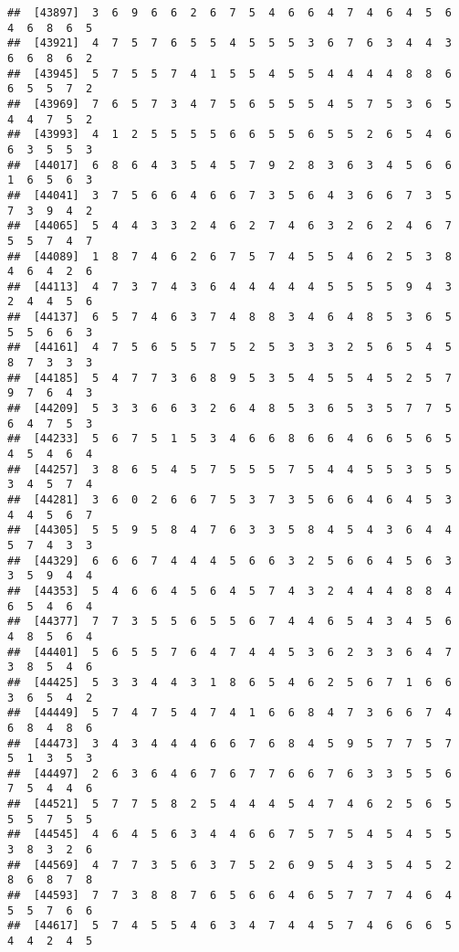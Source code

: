 \documentclass[
]{book}
\begin{document}
\begin{verbatim}
##  [43897]  3  6  9  6  6  2  6  7  5  4  6  6  4  7  4  6  4  5  6  4  6  8  6  5
##  [43921]  4  7  5  7  6  5  5  4  5  5  5  3  6  7  6  3  4  4  3  6  6  8  6  2
##  [43945]  5  7  5  5  7  4  1  5  5  4  5  5  4  4  4  4  8  8  6  6  5  5  7  2
##  [43969]  7  6  5  7  3  4  7  5  6  5  5  5  4  5  7  5  3  6  5  4  4  7  5  2
##  [43993]  4  1  2  5  5  5  5  6  6  5  5  6  5  5  2  6  5  4  6  6  3  5  5  3
##  [44017]  6  8  6  4  3  5  4  5  7  9  2  8  3  6  3  4  5  6  6  1  6  5  6  3
##  [44041]  3  7  5  6  6  4  6  6  7  3  5  6  4  3  6  6  7  3  5  7  3  9  4  2
##  [44065]  5  4  4  3  3  2  4  6  2  7  4  6  3  2  6  2  4  6  7  5  5  7  4  7
##  [44089]  1  8  7  4  6  2  6  7  5  7  4  5  5  4  6  2  5  3  8  4  6  4  2  6
##  [44113]  4  7  3  7  4  3  6  4  4  4  4  4  5  5  5  5  9  4  3  2  4  4  5  6
##  [44137]  6  5  7  4  6  3  7  4  8  8  3  4  6  4  8  5  3  6  5  5  5  6  6  3
##  [44161]  4  7  5  6  5  5  7  5  2  5  3  3  3  2  5  6  5  4  5  8  7  3  3  3
##  [44185]  5  4  7  7  3  6  8  9  5  3  5  4  5  5  4  5  2  5  7  9  7  6  4  3
##  [44209]  5  3  3  6  6  3  2  6  4  8  5  3  6  5  3  5  7  7  5  6  4  7  5  3
##  [44233]  5  6  7  5  1  5  3  4  6  6  8  6  6  4  6  6  5  6  5  4  5  4  6  4
##  [44257]  3  8  6  5  4  5  7  5  5  5  7  5  4  4  5  5  3  5  5  3  4  5  7  4
##  [44281]  3  6  0  2  6  6  7  5  3  7  3  5  6  6  4  6  4  5  3  4  4  5  6  7
##  [44305]  5  5  9  5  8  4  7  6  3  3  5  8  4  5  4  3  6  4  4  5  7  4  3  3
##  [44329]  6  6  6  7  4  4  4  5  6  6  3  2  5  6  6  4  5  6  3  3  5  9  4  4
##  [44353]  5  4  6  6  4  5  6  4  5  7  4  3  2  4  4  4  8  8  4  6  5  4  6  4
##  [44377]  7  7  3  5  5  6  5  5  6  7  4  4  6  5  4  3  4  5  6  4  8  5  6  4
##  [44401]  5  6  5  5  7  6  4  7  4  4  5  3  6  2  3  3  6  4  7  3  8  5  4  6
##  [44425]  5  3  3  4  4  3  1  8  6  5  4  6  2  5  6  7  1  6  6  3  6  5  4  2
##  [44449]  5  7  4  7  5  4  7  4  1  6  6  8  4  7  3  6  6  7  4  6  8  4  8  6
##  [44473]  3  4  3  4  4  4  6  6  7  6  8  4  5  9  5  7  7  5  7  5  1  3  5  3
##  [44497]  2  6  3  6  4  6  7  6  7  7  6  6  7  6  3  3  5  5  6  7  5  4  4  6
##  [44521]  5  7  7  5  8  2  5  4  4  4  5  4  7  4  6  2  5  6  5  5  5  7  5  5
##  [44545]  4  6  4  5  6  3  4  4  6  6  7  5  7  5  4  5  4  5  5  3  8  3  2  6
##  [44569]  4  7  7  3  5  6  3  7  5  2  6  9  5  4  3  5  4  5  2  8  6  8  7  8
##  [44593]  7  7  3  8  8  7  6  5  6  6  4  6  5  7  7  7  4  6  4  5  5  7  6  6
##  [44617]  5  7  4  5  5  4  6  3  4  7  4  4  5  7  4  6  6  6  5  4  4  2  4  5

\end{verbatim}
\end{document}
